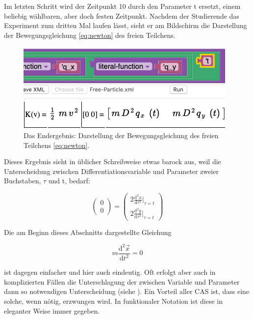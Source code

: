 \documentclass[twocolumn, 10pt]{article}
\begin{document}
Im letzten Schritt wird der Zeitpunkt 10 durch den Parameter t ersetzt, einem beliebig wählbaren, aber doch festen Zeitpunkt. Nachdem der Studierende das Experiment zum dritten Mal laufen lässt, sieht er am Bildschirm die Darstellung der Bewegungsgleichung \ref{eq:newton} des freien Teilchens.

\begin{figure}[H]
\includegraphics[scale=0.4]{bilder/session_82.png}
\caption{Das Endergebnis: Darstellung der Bewegungsgleichung des freien Teilchens \ref{eq:newton}.}
\label{fig:session82}
\end{figure}

Dieses Ergebnis sieht in üblicher Schreibweise etwas barock aus, weil die Unterscheidung zwischen Differentiationsvariable und Parameter zweier Buchstaben, $\tau$ und t, bedarf:

\begin{equation}
\begin{pmatrix} 0 \\ 0 \end{pmatrix} =
\begin{pmatrix} 
2 \frac{\mathrm d^2 x}{\mathrm d \tau^2} |_{\tau=t} \\ 
2 \frac{\mathrm d^2 y}{\mathrm d \tau^2} |_{\tau=t}
\end{pmatrix}
\end{equation}

Die am Beginn dieses Abschnitts dargestellte Gleichung

\begin{equation}
m \frac{\mathrm d^2 \vec{x}}{\mathrm d t^2}=0
\label{eq:newton2}
\end{equation}

ist dagegen einfacher und hier auch eindeutig. Oft erfolgt aber auch in komplizierten Fällen die Unterschlagung der zwischen Variable und Parameter dann so notwendigen Unterscheidung (siehe \cite{cSussmanPaper 6}). Ein Vorteil aller CAS ist, dass eine solche, wenn nötig, erzwungen wird. In funktionaler Notation ist diese in eleganter Weise immer gegeben.
\end{document}
